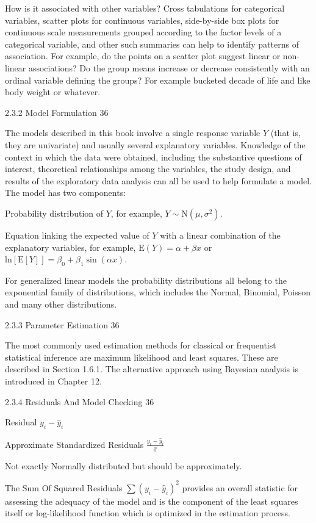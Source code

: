 How is it associated with other variables? Cross tabulations for categorical variables, scatter plots for continuous variables, side-by-side box plots for continuous scale measurements grouped according to the factor levels of a categorical variable, and other such summaries can help to identify patterns of association. For example, do the points on a scatter plot suggest linear or non-linear associations? Do the group means increase or decrease consistently with an ordinal variable defining the groups? For example bucketed decade of life and like body weight or whatever.

2.3.2 Model Formulation 36

The models described in this book involve a single response variable $Y$ (that is, they are univariate) and usually several explanatory variables. Knowledge of the context in which the data were obtained, including the substantive questions of interest, theoretical relationships among the variables, the study design, and results of the exploratory data analysis can all be used to help formulate a model. The model has two components:

Probability distribution of $Y$, for example, $Y \sim \text{N}(\mu,\sigma^2)$.

Equation linking the expected value of $Y$ with a linear combination of the explanatory variables, for example, $\text{E}(Y)=\alpha+\beta x$ or $\text{ln}[\text{E}[Y]]=\beta_0 + \beta_1 \sin (\alpha x)$.

For generalized linear models the probability distributions all belong to the exponential family of distributions, which includes the Normal, Binomial, Poisson and many other distributions.

2.3.3 Parameter Estimation 36

The most commonly used estimation methods for classical or frequentist statistical inference are maximum likelihood and least squares. These are described in Section 1.6.1. The alternative approach using Bayesian analysis is introduced in Chapter 12.

2.3.4 Residuals And Model Checking 36

Residual $y_i-\hat{y}_i$

Approximate Standardized Residuals $\frac{y_i-\hat{y}_i}{\hat{\sigma}}$

Not exactly Normally distributed but should be approximately.

The Sum Of Squared Residuals $\sum (y_i-\hat{y}_i)^2$ provides an overall statistic for assessing the adequacy of the model and is the component of the least squares itself or log-likelihood function which is optimized in the estimation process.

